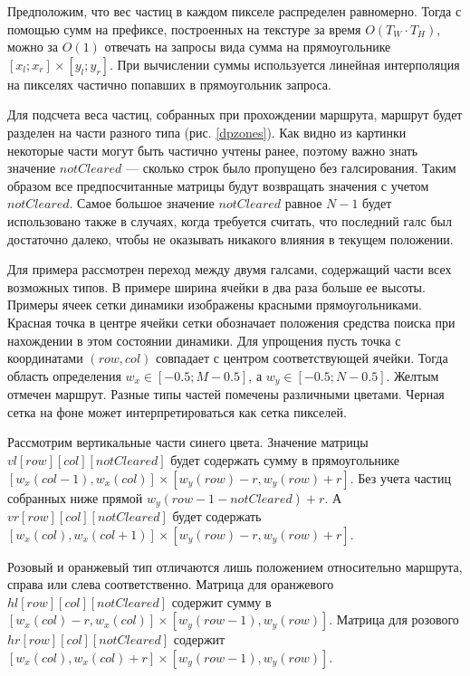 Предположим, что вес частиц в каждом пикселе распределен равномерно. Тогда с помощью
сумм на префиксе, построенных на текстуре за время $O(T_W \cdot T_H)$, можно за $O(1)$
отвечать на запросы вида сумма на прямоугольнике $[x_l ; x_r] \times [y_l ; y_r]$.
При вычислении суммы используется линейная интерполяция на пикселях частично попавших
в прямоугольник запроса.


Для подсчета веса частиц, собранных при прохождении маршрута, маршрут будет разделен на
части разного типа (рис. \ref{dpzones}). Как видно из картинки некоторые части могут
быть частично учтены ранее, поэтому важно знать значение $notCleared$ --- сколько строк
было пропущено без галсирования. Таким образом все предпосчитанные матрицы будут возвращать
значения с учетом $notCleared$. Самое большое значение $notCleared$ равное $N-1$ будет
использовано также в случаях, когда требуется считать, что последний галс был
достаточно далеко, чтобы не оказывать никакого влияния в текущем положении.

Для примера рассмотрен переход между двумя галсами, содержащий части всех возможных типов.
В примере ширина ячейки в два раза больше ее высоты. Примеры ячеек сетки динамики 
изображены красными прямоугольниками. Красная точка в центре 
ячейки сетки обозначает положения средства поиска при нахождении в этом состоянии динамики.
Для упрощения пусть точка с координатами $(row, col)$ совпадает с центром соответствующей ячейки.
Тогда область определения $w_x \in [-0.5; M-0.5]$, а $w_y \in [-0.5; N-0.5]$.
Желтым отмечен маршрут. Разные типы частей помечены различными цветами. Черная сетка на
фоне может интерпретироваться как сетка пикселей.

Рассмотрим вертикальные части синего цвета. Значение матрицы $vl[row][col][notCleared]$
будет содержать сумму в прямоугольнике
$[w_x(col-1), w_x(col)] \times [w_y(row)-r, w_y(row)+r]$. Без 
учета частиц собранных ниже прямой $w_y(row-1-notCleared) + r$. А $vr[row][col][notCleared]$
будет содержать $[w_x(col), w_x(col+1)] \times [w_y(row)-r, w_y(row)+r]$.

Розовый и оранжевый тип отличаются лишь положением относительно маршрута, справа или слева
соответственно. Матрица для оранжевого 
$hl[row][col][notCleared]$ содержит сумму в
$[w_x(col)-r, w_x(col)] \times [w_y(row-1), w_y(row)]$. Матрица для розового
$hr[row][col][notCleared]$ содержит $[w_x(col), w_x(col)+r] \times [w_y(row-1), w_y(row)]$.

